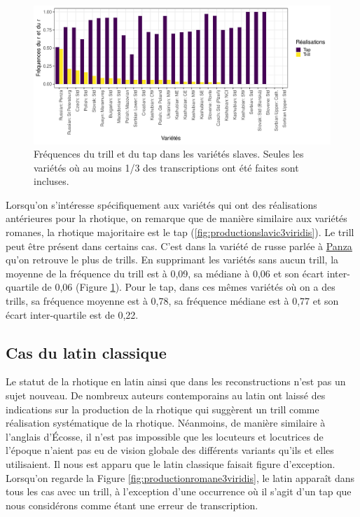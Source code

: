 \begin{figure}
	\centering
	\includegraphics[width=1\linewidth]{substance/images/freq_trill_slavic2}
	\caption[Fréquences du trill et du tap dans les variétés slaves]{Fréquences du trill et du tap dans les variétés slaves. Seules les variétés où au moins 1/3 des transcriptions ont été faites sont incluses.}
	\label{fig:freqtrillslavic}
\end{figure}

Lorsqu'on s'intéresse spécifiquement aux variétés qui ont des réalisations antérieures pour la rhotique, on remarque que de manière similaire aux variétés romanes, la rhotique majoritaire est le tap (\autoref{fig:productionslavic3viridis}). Le trill peut être présent dans certains cas. C'est dans la variété de russe parlée à \href{https://soundcomparisons.com/#/en/Slavic/language/BSv_SvE_Rus_C_Pen_Vadinsk_Dl}{Panza} qu'on retrouve le plus de trills.
En supprimant les variétés sans aucun trill, la moyenne de la fréquence du trill est à 0,09, sa médiane à 0,06 et son écart inter-quartile de 0,06 (Figure \ref{fig:freqtrillslavic}).
Pour le tap, dans ces mêmes variétés où on a des trills, sa fréquence moyenne est à 0,78, sa fréquence médiane est à 0,77 et son écart inter-quartile est de 0,22.\\

\subsection{Cas du latin classique}

Le statut de la rhotique en latin ainsi que dans les reconstructions n'est pas un sujet nouveau. 
De nombreux auteurs contemporains au latin ont laissé des indications sur la production de la rhotique qui suggèrent un trill comme réalisation systématique de la rhotique.
Néanmoins, de manière similaire à l'anglais d'Écosse, il n'est pas impossible que les locuteurs et locutrices de l'époque n'aient pas eu de vision globale des différents variants qu'ils et elles utilisaient.
Il nous est apparu que le latin classique faisait figure d'exception. Lorsqu'on regarde la Figure \ref{fig:productionromane3viridis}, le latin apparaît dans tous les cas avec un trill, à l'exception d'une occurrence où il s'agit d'un tap que nous considérons comme étant une erreur de transcription. \\

